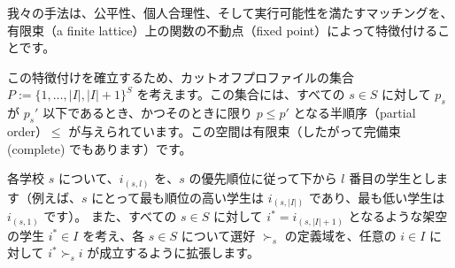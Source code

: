 \documentclass[12pt, a4paper]{article}
\theoremstyle{definition}
\theoremstyle{remark}
\theoremstyle{plain}
\begin{document}


我々の手法は、公平性、個人合理性、そして実行可能性を満たすマッチングを、有限束（a finite lattice）上の関数の不動点（fixed point）によって特徴付けることです。

この特徴付けを確立するため、カットオフプロファイルの集合 \( P := \{ 1, \ldots, | I |, | I | + 1 \} ^S \) を考えます。この集合には、すべての \( s \in S \) に対して \( p_s \) が \( p_s' \) 以下であるとき、かつそのときに限り \( p \leq p' \) となる半順序（partial order）\( \leq \) が与えられています。この空間は有限束（したがって完備束 (complete) でもあります）です。

各学校 \( s \) について、\( i_{(s,l)} \) を、\( s \) の優先順位に従って下から \( l \) 番目の学生とします（例えば、\( s \) にとって最も順位の高い学生は \( i_{(s,|I|)} \) であり、最も低い学生は \( i_{(s,1)} \) です）。
また、すべての \( s \in S \) に対して \( i^* = i_{(s,|I|+1)} \) となるような架空の学生 \( i^* \in I \) を考え、各 \( s \in S \) について選好 \( \succ_s \) の定義域を、任意の \( i \in I \) に対して \( i^* \succ_s i \) が成立するように拡張します。
\end{document}
